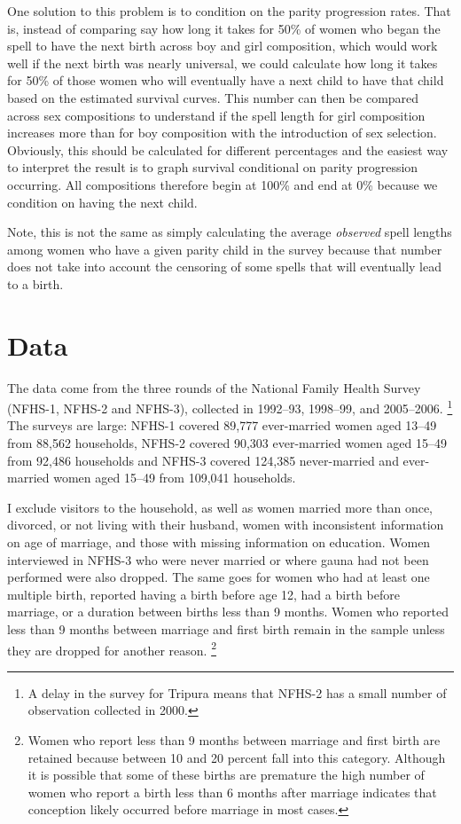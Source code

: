 \documentclass[12pt,letterpaper]{article}
\begin{document}
One solution to this problem is to condition on the parity progression
rates.
That is, instead of comparing say how long it takes for 50\% of women
who began the spell to have the next birth across boy and girl composition, 
which would work well if the next birth was nearly universal, we 
could calculate how long it takes for 50\% of those women who will 
eventually have a next child to have that child based on the estimated
survival curves.
This number can then be compared across sex compositions to 
understand if the spell length for girl composition increases
more than for boy composition with the introduction of sex selection.
Obviously, this should be calculated for different percentages
and the easiest way to interpret the result is to graph survival
conditional on parity progression occurring.
All compositions therefore begin at 100\% and end at 0\% because
we condition on having the next child.

Note, this is not the same as simply calculating the average 
\emph{observed} spell lengths among women who have a given parity
child in the survey because that number does not take into account
the censoring of some spells that will eventually lead to a birth.


\section{Data\label{sec:data}}

The data come from the three rounds of the National Family Health Survey 
(NFHS-1, NFHS-2 and NFHS-3),
collected in 1992--93, 1998--99, and 2005--2006.%
\footnote{
A delay in the survey for Tripura means that NFHS-2 has a small number of observation 
collected in 2000.
}
The surveys are large: NFHS-1 covered 89,777 ever-married women 
aged 13--49 from 88,562 households,
NFHS-2 covered 90,303 ever-married women aged 15--49 from 92,486 households
and NFHS-3 covered 124,385 never-married and ever-married women aged 
15--49 from 109,041 households.

I exclude visitors to the household, as well as
women married more than once, divorced, or not living with their husband,
women with inconsistent information on age of marriage,
and those with missing information on education.
Women interviewed in NFHS-3 who were never married or where gauna had not
been performed were also dropped.
The same goes for women who had at least one multiple birth,
reported having a birth before age 12, had a birth before marriage, or
a duration between births less than 9 months.
Women who reported less than 9 months between marriage and first birth
remain in the sample unless they are dropped for another reason.%
\footnote{
Women who report less than 9 months between marriage and first birth are retained 
because between 10 and 20 percent fall into this category.
Although it is possible that some of these births are premature the high number of
women who report a birth less than 6 months after marriage indicates that conception
likely occurred before marriage in most cases.
}
\end{document}

